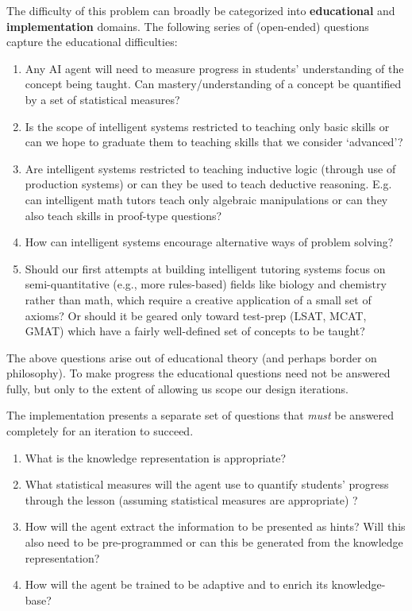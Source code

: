 \documentclass[10pt,letterpaper]{article}
\begin{document}
The difficulty of this problem can broadly be categorized into {\bf educational} and {\bf implementation} domains. The following series of (open-ended) questions capture the educational difficulties:
\begin{enumerate}
    \item Any AI agent will need to measure progress in students' understanding of the concept being taught. Can mastery/understanding of a concept be quantified by a set of statistical measures?
    
    \item Is the scope of intelligent systems restricted to teaching only basic skills or can we hope to graduate them to teaching skills that we consider `advanced'?
    
    \item Are intelligent systems restricted to teaching inductive logic (through use of production systems) or can they be used to teach deductive reasoning. E.g. can intelligent math tutors teach only algebraic manipulations or can they also teach skills in proof-type questions?
    
    \item How can intelligent systems encourage alternative ways of problem solving?
    
    \item Should our first attempts at building intelligent tutoring systems focus on semi-quantitative (e.g., more rules-based) fields like biology and chemistry rather than math, which require a creative application of a small set of axioms? Or should it be geared only toward test-prep (LSAT, MCAT, GMAT) which have a fairly well-defined set of concepts to be taught?
\end{enumerate}

The above questions arise out of educational theory (and perhaps border on philosophy). To make progress the educational questions need not be answered fully, but only to the extent of allowing us scope our design iterations. 

The implementation presents a separate set of questions that {\em must} be answered completely for an iteration to succeed. 

\begin{enumerate}
    \item What is the knowledge representation is appropriate?
    
    \item What statistical measures will the agent use to quantify students' progress through the lesson (assuming statistical measures are appropriate) ?
    
    \item How will the agent extract the information to be presented as hints? Will this also need to be pre-programmed or can this be generated from the knowledge representation?
    
    \item How will the agent be trained to be adaptive and to enrich its knowledge-base?

\end{enumerate}
\end{document}
